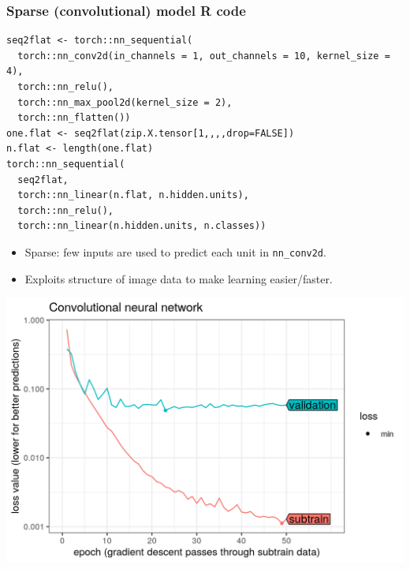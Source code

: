 \documentclass{beamer}
\begin{document}
\begin{frame}[fragile]
  \frametitle{Sparse (convolutional) model R code}

\begin{verbatim}
seq2flat <- torch::nn_sequential(
  torch::nn_conv2d(in_channels = 1, out_channels = 10, kernel_size = 4),
  torch::nn_relu(),
  torch::nn_max_pool2d(kernel_size = 2),
  torch::nn_flatten())
one.flat <- seq2flat(zip.X.tensor[1,,,,drop=FALSE])
n.flat <- length(one.flat)
torch::nn_sequential(
  seq2flat, 
  torch::nn_linear(n.flat, n.hidden.units),
  torch::nn_relu(),
  torch::nn_linear(n.hidden.units, n.classes))
\end{verbatim}

  \begin{itemize}
  \item Sparse: few inputs are used to predict each unit in
    \texttt{nn\_conv2d}.
  \item Exploits structure of image data to make learning
    easier/faster.
  \end{itemize}

\end{frame}
 
\begin{frame}
  \includegraphics[width=\textwidth]{figure-validation-loss-conv}
\end{frame}
 
\end{document}
